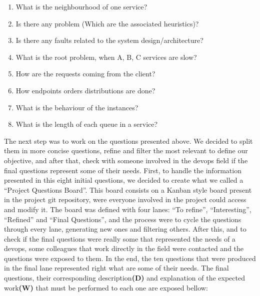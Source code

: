 \begin{enumerate}
    \item What is the neighbourhood of one service?
    \item Is there any problem (Which are the associated heuristics)?
    \item Is there any faults related to the system design/architecture?
    \item What is the root problem, when A, B, C services are slow?
    \item How are the requests coming from the client?
    \item How endpoints orders distributions are done?
    \item What is the behaviour of the instances?
    \item What is the length of each queue in a service?
\end{enumerate}

The next step was to work on the questions presented above. We decided to split them in more concise questions, refine and filter the most relevant to define our objective, and after that, check with someone involved in the \gls{devops} field if the final questions represent some of their needs. First, to handle the information presented in this eight initial questions, we decided to create what we called a ``Project Questions Board''. This board consists on a Kanban \cite{kanban_board} style board present in the project git repository, were everyone involved in the project could access and modify it. The board was defined with four lanes: ``To refine'', ``Interesting'', ``Refined'' and ``Final Questions'', and the process were to cycle the questions through every lane, generating new ones and filtering others. After this, and to check if the final questions were really some that represented the needs of a \gls{devops}, some colleagues that work directly in the field were contacted and the questions were exposed to them. In the end, the ten questions that were produced in the final lane represented right what are some of their needs. The final questions, their corresponding description\textbf{(D)} and explanation of the expected work\textbf{(W)} that must be performed to each one are exposed bellow:

